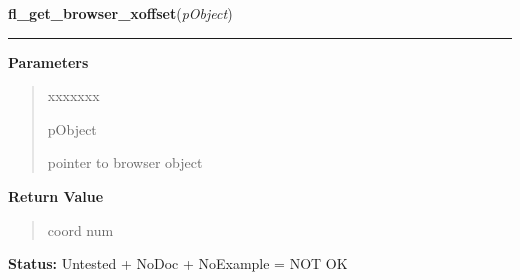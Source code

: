     \label{xformslib:library:fl_get_browser_xoffset}

    \vspace{0.5ex}

\hspace{.8\funcindent}\begin{boxedminipage}{\funcwidth}

    \raggedright \textbf{fl\_get\_browser\_xoffset}(\textit{pObject})

    \vspace{-1.5ex}

    \rule{\textwidth}{0.5\fboxrule}
\setlength{\parskip}{2ex}
\setlength{\parskip}{1ex}
      \textbf{Parameters}
      \vspace{-1ex}

      \begin{quote}
        \begin{Ventry}{xxxxxxx}

          \item[pObject]

          pointer to browser object

        \end{Ventry}

      \end{quote}

      \textbf{Return Value}
    \vspace{-1ex}

      \begin{quote}
      coord num

      \end{quote}

\textbf{Status:} Untested + NoDoc + NoExample = NOT OK



    \end{boxedminipage}

    \label{xformslib:library:fl_get_browser_rel_xoffset}

    \vspace{0.5ex}

